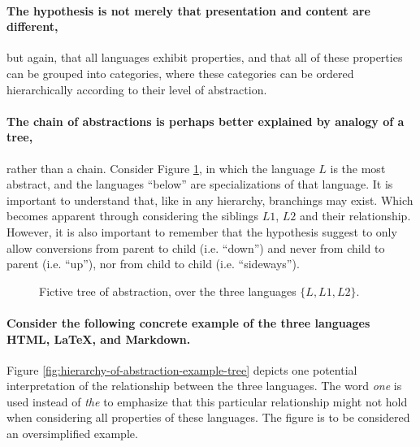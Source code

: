 \documentclass{scrreprt}
\begin{document}
\paragraph{The hypothesis is not merely that presentation and content are different,} but again, that all languages exhibit properties, and that all of these properties can be grouped into categories, where these categories can be ordered hierarchically according to their level of abstraction.

\paragraph{The chain of abstractions is perhaps better explained by analogy of a tree,} rather than a chain. Consider Figure \ref{fig:fictive-specialization-tree}, in which the language $L$ is the most abstract, and the languages ``below'' are specializations of that language. It is important to understand that, like in any hierarchy, branchings may exist. Which becomes apparent through considering the siblings $L1$, $L2$ and their relationship. However, it is also important to remember that the hypothesis suggest to only allow conversions from parent to child (i.e. ``down'') and never from child to parent (i.e. ``up''), nor from child to child (i.e. ``sideways'').

\begin{figure}[h]
  \centering

  \caption{Fictive tree of abstraction, over the three languages $\{L, L1, L2\}$.}
  \label{fig:fictive-specialization-tree}
\end{figure}

\paragraph{Consider the following concrete example of the three languages HTML, \LaTeX{}, and Markdown.} Figure \ref{fig:hierarchy-of-abstraction-example-tree} depicts one potential interpretation of the relationship between the three languages. The word \emph{one} is used instead of \emph{the} to emphasize that this particular relationship might not hold when considering all properties of these languages. The figure is to be considered an oversimplified example.
\end{document}
